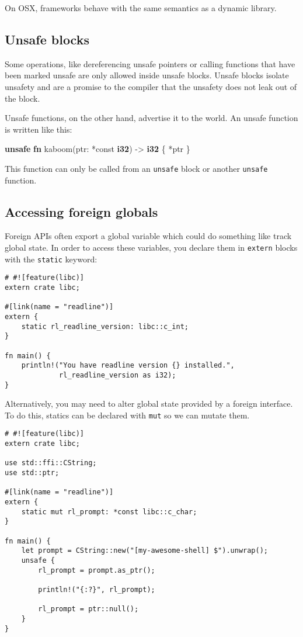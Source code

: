 \documentclass[a4paper,]{book}
\newenvironment{Shaded}{\begin{snugshade}}{\end{snugshade}}
\newcommand{\KeywordTok}[1]{\textcolor[rgb]{0.13,0.29,0.53}{\textbf{{#1}}}}
\newcommand{\NormalTok}[1]{{#1}}
\begin{document}
On OSX, frameworks behave with the same semantics as a dynamic library.

\subsection{Unsafe blocks}\label{unsafe-blocks}

Some operations, like dereferencing unsafe pointers or calling functions
that have been marked unsafe are only allowed inside unsafe blocks.
Unsafe blocks isolate unsafety and are a promise to the compiler that
the unsafety does not leak out of the block.

Unsafe functions, on the other hand, advertise it to the world. An
unsafe function is written like this:

\begin{Shaded}
\begin{Highlighting}[]
\KeywordTok{unsafe} \KeywordTok{fn} \NormalTok{kaboom(ptr: *const }\KeywordTok{i32}\NormalTok{) -> }\KeywordTok{i32} \NormalTok{\{ *ptr \}}
\end{Highlighting}
\end{Shaded}

This function can only be called from an \texttt{unsafe} block or
another \texttt{unsafe} function.

\subsection{Accessing foreign globals}\label{accessing-foreign-globals}

Foreign APIs often export a global variable which could do something
like track global state. In order to access these variables, you declare
them in \texttt{extern} blocks with the \texttt{static} keyword:

\begin{verbatim}
# #![feature(libc)]
extern crate libc;

#[link(name = "readline")]
extern {
    static rl_readline_version: libc::c_int;
}

fn main() {
    println!("You have readline version {} installed.",
             rl_readline_version as i32);
}
\end{verbatim}

Alternatively, you may need to alter global state provided by a foreign
interface. To do this, statics can be declared with \texttt{mut} so we
can mutate them.

\begin{verbatim}
# #![feature(libc)]
extern crate libc;

use std::ffi::CString;
use std::ptr;

#[link(name = "readline")]
extern {
    static mut rl_prompt: *const libc::c_char;
}

fn main() {
    let prompt = CString::new("[my-awesome-shell] $").unwrap();
    unsafe {
        rl_prompt = prompt.as_ptr();

        println!("{:?}", rl_prompt);

        rl_prompt = ptr::null();
    }
}
\end{verbatim}
\end{document}
